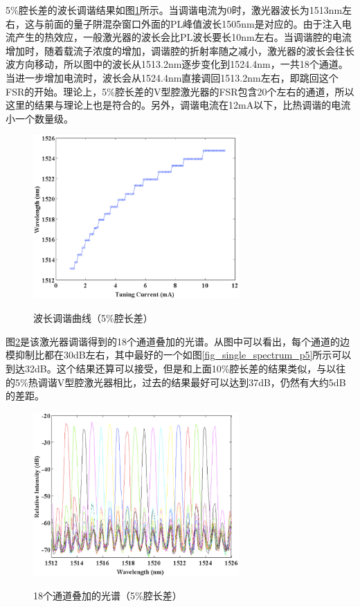 \documentclass{ZJUthesis}
\begin{document}
5\%腔长差的波长调谐结果如图\ref{fig_single_tuning_p5}所示。当调谐电流为0时，激光器波长为1513nm左右，这与前面的量子阱混杂窗口外面的PL峰值波长1505nm是对应的。由于注入电流产生的热效应，一般激光器的波长会比PL波长要长10nm左右。当调谐腔的电流增加时，随着载流子浓度的增加，调谐腔的折射率随之减小，激光器的波长会往长波方向移动，所以图中的波长从1513.2nm逐步变化到1524.4nm，一共18个通道。当进一步增加电流时，波长会从1524.4nm直接调回1513.2nm左右，即跳回这个FSR的开始。理论上，5\%腔长差的V型腔激光器的FSR包含20个左右的通道，所以这里的结果与理论上也是符合的。另外，调谐电流在12mA以下，比热调谐的电流小一个数量级。

\begin{figure}[!ht]
  \centering
  \includegraphics[width=0.7\textwidth]{./Pictures/single_tuning_p5.eps}\\
  \caption{波长调谐曲线（5\%腔长差）}
  \label{fig_single_tuning_p5}
\end{figure}

图\ref{fig_single_spectra_p5}是该激光器调谐得到的18个通道叠加的光谱。从图中可以看出，每个通道的边模抑制比都在30dB左右，其中最好的一个如图\ref{fig_single_spectrum_p5}所示可以到达32dB。这个结果还算可以接受，但是和上面10\%腔长差的结果类似，与以往的5\%热调谐V型腔激光器相比，过去的结果最好可以达到37dB，仍然有大约5dB的差距。

\begin{figure}[!ht]
  \centering
  \includegraphics[width=0.7\textwidth]{./Pictures/single_spectra_p5.eps}\\
  \caption{18个通道叠加的光谱（5\%腔长差）}
  \label{fig_single_spectra_p5}
\end{figure}
\end{document}
